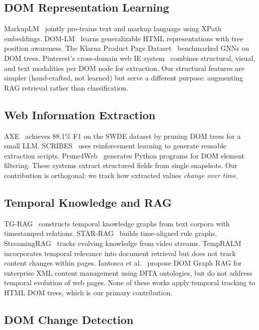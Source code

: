 \documentclass[11pt]{article}
\begin{document}
\subsection{DOM Representation Learning}

MarkupLM~\cite{markuplm2022} jointly pre-trains text and markup language using XPath embeddings. DOM-LM~\cite{domlm2022} learns generalizable HTML representations with tree position awareness. The Klarna Product Page Dataset~\cite{klarna2024} benchmarked GNNs on DOM trees. Pinterest's cross-domain web IE system~\cite{pinterest2025} combines structural, visual, and text modalities per DOM node for extraction. Our structural features are simpler (hand-crafted, not learned) but serve a different purpose: augmenting RAG retrieval rather than classification.

\subsection{Web Information Extraction}

AXE~\cite{axe2025} achieves 88.1\% F1 on the SWDE dataset by pruning DOM trees for a small LLM. SCRIBES~\cite{scribes2025} uses reinforcement learning to generate reusable extraction scripts. Prune4Web~\cite{prune4web2025} generates Python programs for DOM element filtering. These systems extract structured fields from single snapshots. Our contribution is orthogonal: we track how extracted values \emph{change over time}.

\subsection{Temporal Knowledge and RAG}

TG-RAG~\cite{tgrag2025} constructs temporal knowledge graphs from text corpora with timestamped relations. STAR-RAG~\cite{starrag2025} builds time-aligned rule graphs. StreamingRAG~\cite{streamingrag2025} tracks evolving knowledge from video streams. TempRALM~\cite{tempralm2024} incorporates temporal relevance into document retrieval but does not track content changes within pages. Iantosca et al.~\cite{domgraphrag2024} propose DOM Graph RAG for enterprise XML content management using DITA ontologies, but do not address temporal evolution of web pages. None of these works apply temporal tracking to HTML DOM trees, which is our primary contribution.

\subsection{DOM Change Detection}
\end{document}
